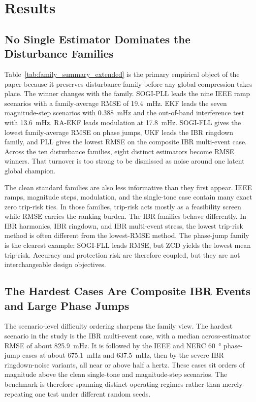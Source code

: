 \section{Results}
\label{sec:results}

\subsection{No Single Estimator Dominates the Disturbance Families}



Table~\ref{tab:family_summary_extended} is the primary empirical object of the paper because it preserves disturbance family before any global compression takes place. The winner changes with the family. SOGI-PLL leads the nine IEEE ramp scenarios with a family-average RMSE of \SI{19.4}{mHz}. EKF leads the seven magnitude-step scenarios with \SI{0.388}{mHz} and the out-of-band interference test with \SI{13.6}{mHz}. RA-EKF leads modulation at \SI{17.8}{mHz}. SOGI-FLL gives the lowest family-average RMSE on phase jumps, UKF leads the IBR ringdown family, and PLL gives the lowest RMSE on the composite IBR multi-event case. Across the ten disturbance families, eight distinct estimators become RMSE winners. That turnover is too strong to be dismissed as noise around one latent global champion.

The clean standard families are also less informative than they first appear. IEEE ramps, magnitude steps, modulation, and the single-tone case contain many exact zero trip-risk ties. In those families, trip-risk acts mostly as a feasibility screen while RMSE carries the ranking burden. The IBR families behave differently. In IBR harmonics, IBR ringdown, and IBR multi-event stress, the lowest trip-risk method is often different from the lowest-RMSE method. The phase-jump family is the clearest example: SOGI-FLL leads RMSE, but ZCD yields the lowest mean trip-risk. Accuracy and protection risk are therefore coupled, but they are not interchangeable design objectives.

\subsection{The Hardest Cases Are Composite IBR Events and Large Phase Jumps}

The scenario-level difficulty ordering sharpens the family view. The hardest scenario in the study is the IBR multi-event case, with a median across-estimator RMSE of about \SI{825.9}{mHz}. It is followed by the IEEE and NERC \SI{60}{\degree} phase-jump cases at about \SI{675.1}{mHz} and \SI{637.5}{mHz}, then by the severe IBR ringdown-noise variants, all near or above half a hertz. These cases sit orders of magnitude above the clean single-tone and magnitude-step scenarios. The benchmark is therefore spanning distinct operating regimes rather than merely repeating one test under different random seeds.

